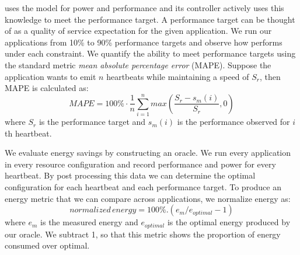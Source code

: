 \SYSTEM{} uses the model for power and performance and its controller
actively uses this knowledge to meet the performance target. A
performance target can be thought of as a quality of service
expectation for the given application. We run our applications from
10\% to 90\% performance targets and observe how \SYSTEM{} performs
under each constraint. We quantify the ability to meet performance
targets using the standard metric \emph{mean absolute percentage
  error} (MAPE).  Suppose the application wants to emit $n$ heartbeats
while maintaining a speed of $S_r$, then MAPE is calculated as:
\begin{equation}
MAPE = 100\% \cdot \frac{1}{n} \sum\limits_{i=1}^{n} max \left( \frac{S_{r} - s_m(i)}{S_r},0 \right)
\end{equation}
where $S_{r}$ is the performance target and $s_m(i)$ is the
performance observed for $i$th heartbeat.


We evaluate energy savings by constructing an oracle.  We run every
application in every resource configuration and record performance and
power for every heartbeat.  By post processing this data we can
determine the optimal configuration for each heartbeat and each
performance target. To produce an energy metric that we can compare
across applications, we normalize energy as:
\begin{equation}
  normalized\,energy = 100\% . (e_m / e_{optimal} - 1)
\end{equation}
where $e_m$ is the measured energy and $e_{optimal}$ is the optimal
energy produced by our oracle. We subtract 1, so that this metric
shows the proportion of energy consumed over optimal.  


